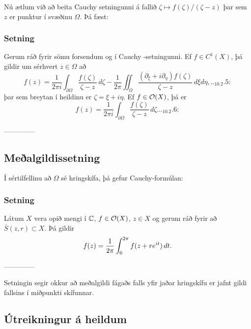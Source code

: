 Nú ætlum við að beita Cauchy setningunni á fallið 
$\zeta\mapsto f(\zeta)/(\zeta-z)$ þar sem $z$ er punktur í
svæðinu $\Omega$.  Þá fæst:

\subsubsection{Setning}
Gerum ráð fyrir sömu forsendum og í Cauchy -setn\-ing\-unni.  Ef
$f\in C^1(X)$, þá gildir um sérhvert $z\in \Omega$ að
\begin{equation*}
f(z)=\dfrac 1{2 \pi i}\int_{\partial\Omega}\dfrac
{f(\zeta)}{\zeta-z}\, d\zeta -\dfrac 1{2\pi}\iint_{\Omega}
\dfrac{(\partial_\xi+i\partial_\eta)f(\zeta)}
{\zeta-z}\, d\xi d\eta, 

.. _10.2.5:

\end{equation*}
þar sem breytan í heildinu er ${\zeta}={\xi}+i\eta$.
Ef $f\in {\cal O}(X)$, þá er 
\begin{equation*}
f(z)=\dfrac 1{2 \pi i}\int_{\partial\Omega}\dfrac
{f(\zeta)}{\zeta-z}\, d\zeta.

.. _10.2.6:

\end{equation*}


--------------




\subsection*{Meðalgildissetning}

Í sértilfellinu að $\Omega$ sé hringskífa, þá gefur Cauchy-formúlan:

\subsubsection{Setning}  
Látum $X$ vera opið mengi í ${\mathbb C}$, $f\in
{\cal O}(X)$,  $z\in X$
og gerum ráð fyrir að $\overline S(z,r)\subset X$.  
Þá  gildir
 $$f(z)=\dfrac 1{2\pi} \int_0\sp{2\pi}f(z+re\sp{it})\, dt.
 $$


--------------




Setningin segir okkur að meðalgildi fágaðs falls yfir jaðar
hringskífu er jafnt gildi fallsins í miðpunkti skífunnar.


\subsection*{Útreikningur á heildum}

